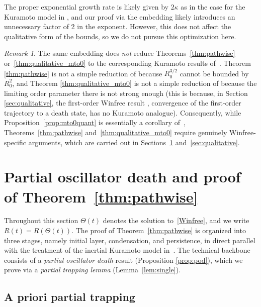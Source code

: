 \documentclass[11pt,reqno]{amsart}
\newcounter{name}
\theoremstyle{definition}
\theoremstyle{remark}
\newtheorem{remark}[lemma]{Remark}
\begin{document}
The proper exponential growth rate is likely given by $2\kappa$ as in the case for the Kuramoto model in \cite{cho2025inertia}, and our proof via the embedding likely introduces an unnecessary factor of 2 in the exponent. However,  this does not
affect the qualitative form of the bounds, so we do not pursue this optimization here.

\begin{remark}
The same embedding does \emph{not} reduce
Theorems~\ref{thm:pathwise} or~\ref{thm:qualitative_mto0} to the
corresponding Kuramoto results of~\cite{cho2025inertia,cho2025quantitative}. Theorem \ref{thm:pathwise} is not a simple reduction of \cite[Theorem 1.1]{cho2025quantitative} because $R_0^{3/2}$ cannot be bounded by $R_0^{2}$, and Theorem \ref{thm:qualitative_mto0} is not a simple reduction of \cite[Theorem 1.2]{cho2025inertia} because the limiting order parameter there is not strong enough (this is because, in Section \ref{sec:qualitative}, the first-order Winfree
result \cite{ha2015emergence}, convergence of the
first-order trajectory to a death state, has no Kuramoto analogue).
Consequently, while Proposition~\ref{prop:mto0quant} is essentially a
corollary of~\cite[Proposition~3.2]{cho2025inertia},
Theorems~\ref{thm:pathwise} and~\ref{thm:qualitative_mto0} require
genuinely Winfree-specific arguments, which are carried out in
Sections~\ref{sec:pathwise-proof} and~\ref{sec:qualitative}.
\end{remark}

\section{Partial oscillator death and proof of Theorem~\ref{thm:pathwise}}
\label{sec:pathwise-proof}

Throughout this section $\Theta(t)$ denotes the solution
to~\eqref{Winfree}, and we write $R(t)=R(\Theta(t))$. The proof of
Theorem~\ref{thm:pathwise} is organized into three stages, namely initial
layer, condensation, and persistence, in direct parallel with the
treatment of the inertial Kuramoto model
in~\cite{cho2025quantitative}. The technical backbone consists of a \emph{partial oscillator death} result (Proposition \ref{prop:pod}), which we prove via a \emph{partial trapping lemma} (Lemma~\ref{lem:single}).

\subsection{A priori partial trapping}
\end{document}
